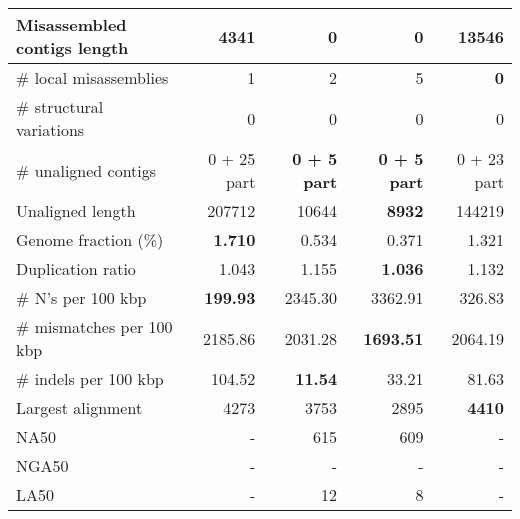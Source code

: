 \documentclass[12pt,a4paper]{article}
\begin{document}
\begin{table}[ht]
\begin{center}
\begin{tabular}{|l*{4}{|r}|}
Misassembled contigs length & 4341 & {\bf 0} & {\bf 0} & 13546 \\ \hline
\# local misassemblies & 1 & 2 & 5 & {\bf 0} \\ \hline
\# structural variations & 0 & 0 & 0 & 0 \\ \hline
\# unaligned contigs & 0 + 25 part & {\bf 0 + 5 part} & {\bf 0 + 5 part} & 0 + 23 part \\ \hline
Unaligned length & 207712 & 10644 & {\bf 8932} & 144219 \\ \hline
Genome fraction (\%) & {\bf 1.710} & 0.534 & 0.371 & 1.321 \\ \hline
Duplication ratio & 1.043 & 1.155 & {\bf 1.036} & 1.132 \\ \hline
\# N's per 100 kbp & {\bf 199.93} & 2345.30 & 3362.91 & 326.83 \\ \hline
\# mismatches per 100 kbp & 2185.86 & 2031.28 & {\bf 1693.51} & 2064.19 \\ \hline
\# indels per 100 kbp & 104.52 & {\bf 11.54} & 33.21 & 81.63 \\ \hline
Largest alignment & 4273 & 3753 & 2895 & {\bf 4410} \\ \hline
NA50 & - & 615 & 609 & - \\ \hline
NGA50 & - & - & - & - \\ \hline
LA50 & - & 12 & 8 & - \\ \hline
\end{tabular}
\end{center}
\end{table}
\end{document}
